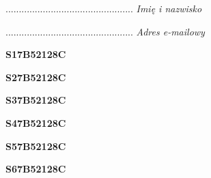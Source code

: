 \begin{turn}{90}\begin{minipage}{\linewidth} \vspace{20mm} ................................................  \textit{Imię i nazwisko}\end{minipage}\end{turn}

\begin{turn}{90}\begin{minipage}{\linewidth} \vspace{20mm} ................................................  \textit{Adres e-mailowy}\end{minipage}\end{turn}

\begin{turn}{90}\huge \begin{minipage}{\linewidth} \vspace{10mm}\textbf{S17B52128C}\end{minipage}\end{turn}

\begin{turn}{90}\huge \begin{minipage}{\linewidth} \vspace{10mm}\textbf{S27B52128C}\end{minipage}\end{turn}

\begin{turn}{90}\huge \begin{minipage}{\linewidth} \vspace{10mm}\textbf{S37B52128C}\end{minipage}\end{turn}

\begin{turn}{90}\huge \begin{minipage}{\linewidth} \vspace{10mm}\textbf{S47B52128C}\end{minipage}\end{turn}

\begin{turn}{90}\huge \begin{minipage}{\linewidth} \vspace{10mm}\textbf{S57B52128C}\end{minipage}\end{turn}

\begin{turn}{90}\huge \begin{minipage}{\linewidth} \vspace{10mm}\textbf{S67B52128C}\end{minipage}\end{turn}

